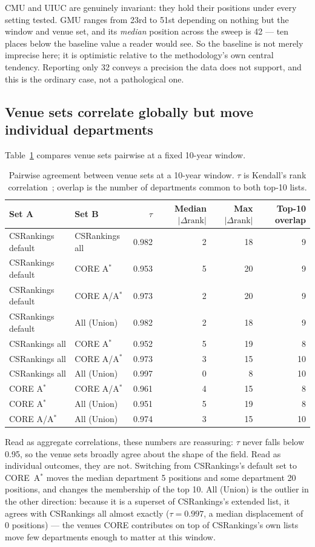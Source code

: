 \documentclass[11pt]{article}
\newcommand{\csr}{CSRankings}
\begin{document}
CMU and UIUC are genuinely invariant: they hold their positions
under every setting tested. GMU ranges from 23rd to 51st depending on
nothing but the window and venue set, and its \emph{median} position across the
sweep is 42 --- ten places below the baseline value a reader would see. So the
baseline is not merely imprecise here; it is optimistic relative to the
methodology's own central tendency. Reporting only 32 conveys a precision the
data does not support, and this is the ordinary case, not a pathological one.

\subsection{Venue sets correlate globally but move individual departments}
\label{sec:venue}

Table~\ref{tab:venue} compares venue sets pairwise at a fixed 10-year window.

\begin{table}[t]
\centering
\caption{Pairwise agreement between venue sets at a 10-year window. $\tau$ is
Kendall's rank correlation~\cite{kendall1938}; overlap is the number of
departments common to both top-10 lists.}
\label{tab:venue}
\small
\begin{tabular}{llrrrr}
\toprule
Set A & Set B & $\tau$ & Median $|\Delta\text{rank}|$ & Max $|\Delta\text{rank}|$ & Top-10 overlap \\
\midrule
\csr{} default & \csr{} all    & 0.982 & 2 & 18 & 9 \\
\csr{} default & CORE A$^*$    & 0.953 & 5 & 20 & 9 \\
\csr{} default & CORE A/A$^*$  & 0.973 & 2 & 20 & 9 \\
\csr{} default & All (Union)   & 0.982 & 2 & 18 & 9 \\
\csr{} all     & CORE A$^*$    & 0.952 & 5 & 19 & 8 \\
\csr{} all     & CORE A/A$^*$  & 0.973 & 3 & 15 & 10 \\
\csr{} all     & All (Union)   & 0.997 & 0 & 8  & 10 \\
CORE A$^*$     & CORE A/A$^*$  & 0.961 & 4 & 15 & 8 \\
CORE A$^*$     & All (Union)   & 0.951 & 5 & 19 & 8 \\
CORE A/A$^*$   & All (Union)   & 0.974 & 3 & 15 & 10 \\
\bottomrule
\end{tabular}
\end{table}

Read as aggregate correlations, these numbers are reassuring: $\tau$ never
falls below 0.95, so the venue sets broadly agree about the shape of the field.
Read as individual outcomes, they are not. Switching from \csr{}'s default set
to CORE~A$^*$ moves the median department 5 positions and some department 20
positions, and changes the membership of the top 10. All (Union) is the
outlier in the other direction: because it is a superset of \csr{}'s extended
list, it agrees with \csr{} all almost exactly ($\tau = 0.997$, a median
displacement of 0 positions) --- the venues CORE contributes on top of \csr{}'s
own lists move few departments enough to matter at this window.
\end{document}
